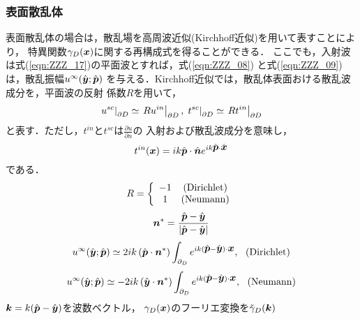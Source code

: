 \subsubsection{表面散乱体}
表面散乱体の場合は，散乱場を高周波近似(Kirchhoff近似)を用いて表すことにより，
特異関数$\gamma_D(\mbox{\boldmath $x$})$に関する再構成式を得ることができる．
ここでも，入射波は式(\ref{eqn:ZZZ_17})の平面波とすれば，式(\ref{eqn:ZZZ_08})
と式(\ref{eqn:ZZZ_09})は，散乱振幅$u^{\infty}(\hat{\mbox{\boldmath $y$}};\hat{\mbox{\boldmath $p$}})$
を与える．Kirchhoff近似では，散乱体表面おける散乱波成分を，平面波の反射
係数$R$を用いて，
\begin{equation}
	\left. u^{sc}\right|_{\partial D} \simeq \left. R u^{in}\right|_{\partial D}
	,\\
	\left. t^{sc}\right|_{\partial D} \simeq \left. R t^{in}\right|_{\partial D}
	\label{eqn:ZZZ_Kirch}
\end{equation}
と表す．ただし，$t^{in}$と$t^{sc}$は$\frac{\partial u}{\partial n}$の
入射および散乱波成分を意味し，
\begin{equation}
	t^{in}(\mbox{\boldmath $x$}) = ik\hat{\mbox{\boldmath $p$}}\cdot \hat{\mbox{\boldmath $n$}} e^{ik\hat{\mbox{\boldmath $p$}}\cdot \hat{\mbox{\boldmath $x$}}}
	\label{eqn:ZZZ_tin}
\end{equation}
である．
\begin{equation}
	R=\left\{
	\begin{array}{cc}
		-1 & ({\rm Dirichlet}) \\
		 1 & ({\rm Neumann})
	\end{array}
	\right.
	\label{eqn:ZZZ_Rcoef}
\end{equation}
\begin{equation}
	\mbox{\boldmath $n$}^*= \frac{
		\hat{\mbox{\boldmath $p$}}- \hat{\mbox{\boldmath $y$}}
		}{
		\left|
		\hat{\mbox{\boldmath $p$}}- \hat{\mbox{\boldmath $y$}}
		\right|
		}
	\label{eqn:}
\end{equation}
\begin{equation}
	u^{\infty}(\hat{\mbox{\boldmath $y$}};\hat{\mbox{\boldmath $p$}})
	\simeq
	2ik \left(\hat{\mbox{\boldmath $p$}}\cdot \mbox{\boldmath $n$}^*\right)
	\int_{ \partial_D }
	e^{ik( \hat{\mbox{\boldmath $p$}} - \hat{\mbox{\boldmath $y$}})\cdot\mbox{\boldmath $x$}}
	, \ \ ({\rm Dirichlet})
	\label{eqn:ZZZ_uinf_D}
\end{equation}
\begin{equation}
	u^{\infty}(\hat{\mbox{\boldmath $y$}};\hat{\mbox{\boldmath $p$}})
	\simeq
	-2ik \left(\hat{\mbox{\boldmath $y$}}\cdot \mbox{\boldmath $n$}^*\right)
	\int_{ \partial_D }
	e^{ik( \hat{\mbox{\boldmath $p$}} - \hat{\mbox{\boldmath $y$}})\cdot\mbox{\boldmath $x$}}
	, \ \ ({\rm Neumann})
	\label{eqn:ZZZ_uinf_N}
\end{equation}
$\mbox{\boldmath $k$}=k(\hat{\mbox{\boldmath $p$}}-\hat{\mbox{\boldmath $y$}})$を波数ベクトル，
$\gamma_D(\mbox{\boldmath $x$})$のフーリエ変換を$\tilde{\gamma}_D(\mbox{\boldmath $k$})$
